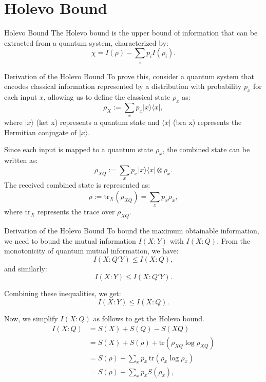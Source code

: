 \section{Holevo Bound}

\begin{frame}{Holevo Bound}
The Holevo bound is the upper bound of information that can be extracted from a quantum system, characterized by:
\[
\chi = I(\rho) - \sum_i p_i I(\rho_i).
\]
\end{frame}

\begin{frame}{Derivation of the Holevo Bound}
To prove this, consider a quantum system that encodes classical information represented by a distribution with probability \( p_x \) for each input \( x \), allowing us to define the classical state \( \rho_x \) as:
\[
\rho_X := \sum_x p_x |x\rangle \langle x|,
\]
where \( |x\rangle \) (ket x) represents a quantum state and \( \langle x| \) (bra x) represents the Hermitian conjugate of \( |x\rangle \).

Since each input is mapped to a quantum state \( \rho_x \), the combined state can be written as:
\[
\rho_{XQ} := \sum_x p_x |x\rangle \langle x| \otimes \rho_x.
\]
The received combined state is represented as:
\[
\rho := \text{tr}_X(\rho_{XQ}) = \sum_x p_x \rho_x,
\]
where \( \text{tr}_X \) represents the trace over \( \rho_{XQ} \).
\end{frame}

\begin{frame}{Derivation of the Holevo Bound}
To bound the maximum obtainable information, we need to bound the mutual information \( I(X : Y) \) with \( I(X : Q) \). From the monotonicity of quantum mutual information, we have:
\[
I(X : Q'Y) \leq I(X : Q),
\]
and similarly:
\[
I(X : Y) \leq I(X : Q'Y).
\]

Combining these inequalities, we get:
\[
I(X : Y) \leq I(X : Q).
\]

Now, we simplify \( I(X : Q) \) as follows to get the Holevo bound.
\begin{align*}
I(X : Q) &= S(X) + S(Q) - S(XQ) \\
         &= S(X) + S(\rho) + \text{tr}(\rho_{XQ} \log \rho_{XQ}) \\
         &= S(\rho) + \sum_x p_x \, \text{tr}(\rho_x \log \rho_x) \\
         &= S(\rho) - \sum_x p_x S(\rho_x),
\end{align*}
\end{frame}
